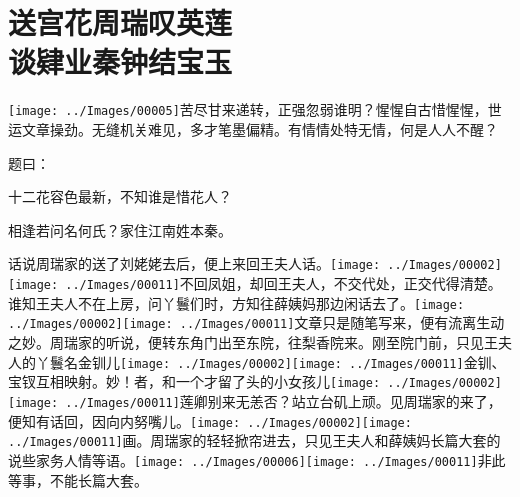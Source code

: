 

\chapter{送宫花周瑞叹英莲\\谈肄业秦钟结宝玉}\label{part0011_split_000.htmlux5cux23calibre_pb_0}

{\texttt{[image: ../Images/00005]}苦尽甘来递转，正强忽弱谁明？惺惺自古惜惺惺，世运文章操劲。无缝机关难见，多才笔墨偏精。有情情处特无情，何是人人不醒？}

题曰：

十二花容色最新，不知谁是惜花人？

相逢若问名何氏？家住江南姓本秦。

话说周瑞家的送了刘姥姥去后，便上来回王夫人话。{\texttt{[image: ../Images/00002]}\texttt{[image: ../Images/00011]}\footnotesize \kaishu 不回凤姐，却回王夫人，不交代处，正交代得清楚。}谁知王夫人不在上房，问丫鬟们时，方知往薛姨妈那边闲话去了。{\texttt{[image: ../Images/00002]}\texttt{[image: ../Images/00011]}\footnotesize \kaishu 文章只是随笔写来，便有流离生动之妙。}周瑞家的听说，便转东角门出至东院，往梨香院来。刚至院门前，只见王夫人的丫鬟名金钏儿{\texttt{[image: ../Images/00002]}\texttt{[image: ../Images/00011]}\footnotesize \kaishu 金钏、宝钗互相映射。妙！}者，和一个才留了头的小女孩儿{\texttt{[image: ../Images/00002]}\texttt{[image: ../Images/00011]}\footnotesize \kaishu 莲卿别来无恙否？}站立台矶上顽。见周瑞家的来了，便知有话回，因向内努嘴儿。{\texttt{[image: ../Images/00002]}\texttt{[image: ../Images/00011]}\footnotesize \kaishu 画。}周瑞家的轻轻掀帘进去，只见王夫人和薛姨妈长篇大套的说些家务人情等语。{\texttt{[image: ../Images/00006]}\texttt{[image: ../Images/00011]}\footnotesize \kaishu 非此等事，不能长篇大套。}

